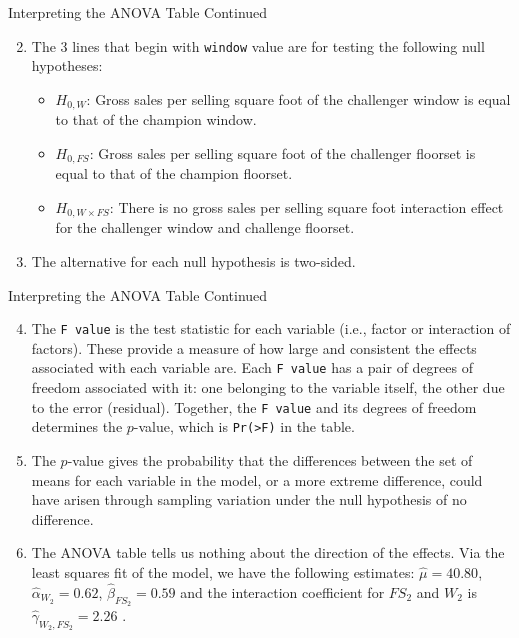 \documentclass[pdf]{beamer}
\theoremstyle{remark}
\theoremstyle{definition}
\begin{document}
\begin{frame}[t]{Interpreting the ANOVA Table Continued}
\begin{enumerate}
  \setcounter{enumi}{1}
  \item The 3 lines that begin with \texttt{window} value are for testing the following null hypotheses:
  \begin{itemize}
    \item $H_{0,W}\text{:}$  Gross sales per selling square foot of the challenger window is equal to that of the champion window. 
    \item $H_{0,FS}\text{:}$  Gross sales per selling square foot of the challenger floorset is equal to that of the champion floorset. 
    \item  $H_{0,W \times FS}\text{:}$ There is no gross sales per selling square foot interaction effect for the challenger window and challenge floorset.
  \end{itemize}
 \item The alternative for each null hypothesis is two-sided.
\end{enumerate}
\end{frame}

\begin{frame}[t]{Interpreting the ANOVA Table Continued}
\begin{enumerate}
  \setcounter{enumi}{3}
 \item The \texttt{F value} is the test statistic for each variable (i.e., factor or interaction of factors). These provide a measure of how large and consistent the effects associated with each variable are. Each \texttt{F value} has a pair of degrees of freedom associated with it: one belonging to the variable itself, the other due to the error (residual). Together, the \texttt{F value} and its degrees of freedom determines the $p$-value, which is \texttt{Pr(>F)} in the table.
 \item The $p$-value gives the probability that the differences between the set of means for each variable in the model, or a more extreme difference, could have arisen through sampling variation under the null hypothesis of no difference.
 \item The ANOVA table tells us nothing about the direction of the effects.  Via the least squares fit of the model, we have the following estimates:  $\hat{\mu} = 40.80$, $\hat{\alpha}_{W_2} = 0.62$, $\hat{\beta}_{FS_2} = 0.59$ and the interaction coefficient for $FS_2$ and $W_2$ is $ \hat{\gamma}_{W_2,FS_2} =  2.26$ .
\end{enumerate} 
\end{frame}
\end{document}
